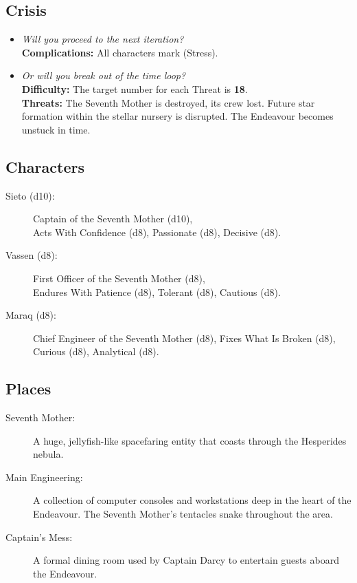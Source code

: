 \documentclass[11pt, a5paper, parskip=half-, DIV=12]{scrartcl}
\begin{document}
\subsection*{Crisis}
\begin{itemize}
	\item \textit{Will you proceed to the next iteration?} \\ \textbf{Complications:} All characters mark  (Stress). 
	\item \textit{Or will you break out of the time loop?} \\ \textbf{Difficulty:} The target number for each Threat is \textbf{18}. \\ \textbf{Threats:} The Seventh Mother is destroyed, its crew lost. Future star formation within the stellar nursery is disrupted. The Endeavour becomes unstuck in time.
\end{itemize}
\newpage

\subsection*{Characters}
\begin{description}
	\item[Sieto (d10):] Captain of the Seventh Mother (d10), \\ Acts With Confidence (d8), Passionate (d8), Decisive (d8).
	\item[Vassen (d8):] First Officer of the Seventh Mother (d8), \\ Endures With Patience (d8), Tolerant (d8),  Cautious (d8).
	\item[Maraq (d8):] Chief Engineer of the Seventh Mother  (d8), Fixes What Is Broken (d8), Curious (d8), Analytical (d8).
\end{description}

\subsection*{Places}
\begin{description}
	\item[Seventh Mother:] A huge, jellyfish-like spacefaring entity that coasts through the Hesperides nebula.
	\item[Main Engineering:] A collection of computer consoles and workstations deep in the heart of the Endeavour. The Seventh Mother's tentacles snake throughout the area.
	\item[Captain's Mess:] A formal dining room used by Captain Darcy to entertain guests aboard the Endeavour.
\end{description}
\end{document}
